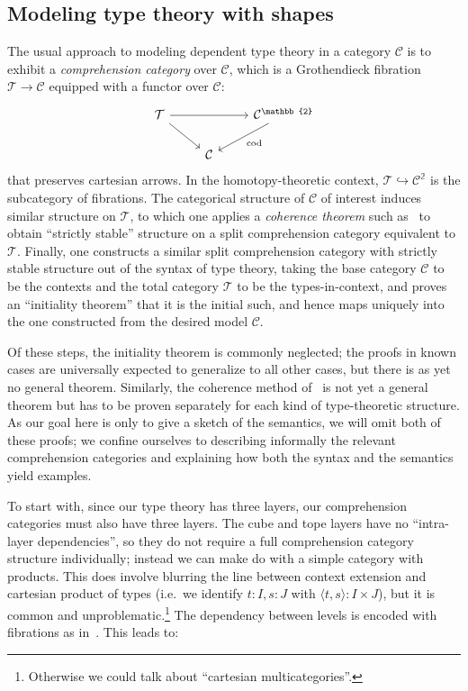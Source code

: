 \documentclass[12pt]{amsart}
\theoremstyle{plain}
\theoremstyle{definition}
\theoremstyle{remark}
\numberwithin{equation}{section}
\newcommand{\pair}[1]{\langle #1\rangle}
\newcommand{\two}{\mathbb{2}}
\newcommand{\C}{\mathcal{C}}
\newcommand{\T}{\mathcal{T}}
\begin{document}
\subsection{Modeling type theory with shapes}
\label{sec:models-type-theory}

The usual approach to modeling dependent type theory in a category $\C$ is to exhibit a \emph{comprehension category} over $\C$, which is a Grothendieck fibration $\T\to\C$ equipped with a functor over $\C$:
\[
\begin{tikzcd}
  \T \ar[rr] \ar[dr] && \C^\two \ar[dl,"\mathrm{cod}"] \\ &\C
\end{tikzcd}
\]
that preserves cartesian arrows.
In the homotopy-theoretic context, $\T \hookrightarrow \C^\two$ is the subcategory of fibrations.
The categorical structure of $\C$ of interest induces similar structure on $\T$, to which one applies a \emph{coherence theorem} such as~\cite{LW} to obtain ``strictly stable'' structure on a split comprehension category equivalent to $\T$.
Finally, one constructs a similar split comprehension category with strictly stable structure out of the syntax of type theory, taking the base category $\C$ to be the contexts and the total category $\T$ to be the types-in-context, and proves an ``initiality theorem'' that it is the initial such, and hence maps uniquely into the one constructed from the desired model $\C$.

Of these steps, the initiality theorem is commonly neglected; the proofs in known cases are universally expected to generalize to all other cases, but there is as yet no general theorem.
Similarly, the coherence method of~\cite{LW} is not yet a general theorem but has to be proven separately for each kind of type-theoretic structure.
As our goal here is only to give a sketch of the semantics, we will omit both of these proofs; we confine ourselves to describing informally the relevant comprehension categories and explaining how both the syntax and the semantics yield examples.

To start with, since our type theory has three layers, our comprehension categories must also have three layers.
The cube and tope layers have no ``intra-layer dependencies'', so they do not require a full comprehension category structure individually; instead we can make do with a simple category with products.
This does involve blurring the line between context extension and cartesian product of types (i.e.\ we identify $t:I,s:J$ with $\pair{t,s}:I\times J$), but it is common and unproblematic.\footnote{Otherwise we could talk about ``cartesian multicategories''.}
The dependency between levels is encoded with fibrations as in~\cite{J}.
This leads to:
\end{document}
